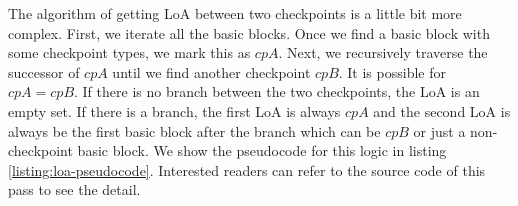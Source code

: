 The algorithm of getting LoA between two checkpoints is a little bit more
complex. First, we iterate all the basic blocks. Once we find a basic block with
some checkpoint types, we mark this as $cpA$. Next, we recursively traverse the
successor of $cpA$ until we find another checkpoint $cpB$. It is possible for
$cpA = cpB$. If there is no branch between the two checkpoints, the LoA is an
empty set. If there is a branch, the first LoA is always $cpA$ and the second
LoA is always be the first basic block after the branch \textemdash{} which can
be $cpB$ or just a non-checkpoint basic block. We show the pseudocode for this
logic in listing \ref{listing:loa-pseudocode}.  Interested readers can refer to
the source code of this pass to see the detail.
